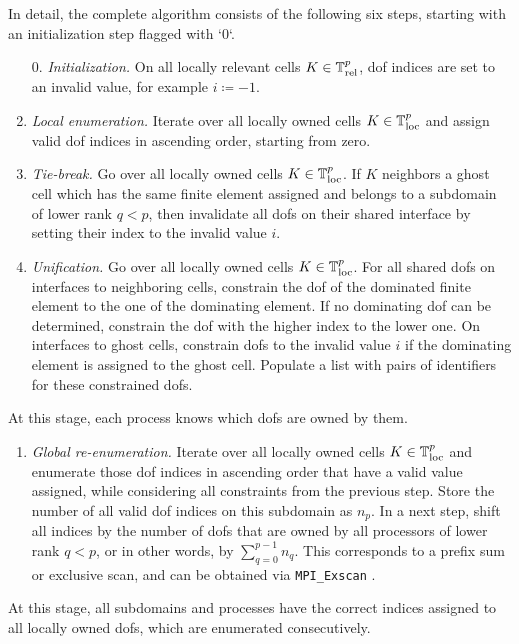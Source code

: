In detail, the complete algorithm consists of the following six steps, starting with an initialization step flagged with `0`.
\begin{enumerate}
  \item[0.] \textit{Initialization.}
  On all locally relevant cells $K \in \mathbb{T}^p_{\text{rel}}$, \gls{dof} indices are set to an invalid value, for example $i \coloneqq -1$.
  \item \textit{Local enumeration.}
  Iterate over all locally owned cells $K \in \mathbb{T}^p_{\text{loc}}$ and assign valid \gls{dof} indices in ascending order, starting from zero.
  \item \textit{Tie-break.}
  Go over all locally owned cells $K \in \mathbb{T}^p_{\text{loc}}$. If $K$ neighbors a ghost cell which has the same finite element assigned and belongs to a subdomain of lower rank $q < p$, then invalidate all \glspl{dof} on their shared interface by setting their index to the invalid value $i$.
  \item \textit{Unification.}
  Go over all locally owned cells $K \in \mathbb{T}^p_{\text{loc}}$. For all shared \glspl{dof} on interfaces to neighboring cells, constrain the \gls{dof} of the dominated finite element to the one of the dominating element. If no dominating \gls{dof} can be determined, constrain the \gls{dof} with the higher index to the lower one. On interfaces to ghost cells, constrain \glspl{dof} to the invalid value $i$ if the dominating element is assigned to the ghost cell.
  Populate a list with pairs of identifiers for these constrained \glspl{dof}.
\end{enumerate}
At this stage, each process knows which \glspl{dof} are owned by them.
\begin{enumerate}[resume]
  \item \textit{Global re-enumeration.}
  Iterate over all locally owned cells $K \in \mathbb{T}^p_{\text{loc}}$
  and enumerate those \gls{dof} indices in ascending order that have a valid value assigned, while considering all constraints from the previous step. Store the number of all valid \gls{dof} indices on this subdomain as $n_p$. In a next step, shift all indices by the number of \glspl{dof} that are owned by all processors of lower rank $q < p$, or in other words, by $\sum_{q=0}^{p-1} n_q$. This corresponds to a prefix sum or exclusive scan, and can be obtained via \texttt{MPI\_Exscan} \textcite{mpi31}.
\end{enumerate}
At this stage, all subdomains and processes have the correct indices assigned to all locally owned \glspl{dof}, which are enumerated consecutively.
